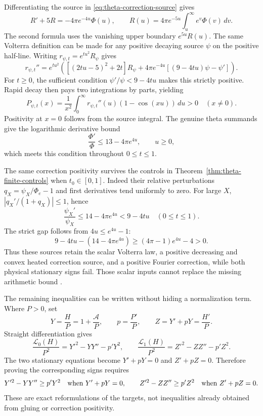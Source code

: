 \documentclass[11pt]{article}
\numberwithin{equation}{section}
\theoremstyle{definition}
\theoremstyle{remark}
\begin{document}
Differentiating the source in
\eqref{eq:theta-correction-source} gives
\begin{equation}
 R'+5R=-4\pi e^{-4u}\Phi(u),\qquad
 R(u)=4\pi e^{-5u}\int_u^\infty e^v\Phi(v)\,dv.
 \label{eq:theta-volterra-law}
\end{equation}
The second formula uses the vanishing upper boundary $e^{5u}R(u)$.
The same Volterra definition can be made for any positive decaying
source $\psi$ on the positive half-line.  Writing
$r_{\psi,t}=e^{tu^2}R_\psi$ gives
\begin{equation}
 r_{\psi,t}''=e^{tu^2}\left(
   [(2tu-5)^2+2t]R_\psi
    +4\pi e^{-4u}[(9-4tu)\psi-\psi']\right).
 \label{eq:theta-correction-curvature}
\end{equation}
For $t\ge0$, the sufficient condition
$\psi'/\psi<9-4tu$ makes this strictly positive.  Rapid decay then
pays two integrations by parts, yielding
\begin{equation}
 P_{\psi,t}(x)=\frac1{x^2}\int_0^\infty
                r_{\psi,t}''(u)(1-\cos(xu))\,du>0
 \quad(x\ne0).
 \label{eq:theta-positive-correction}
\end{equation}
Positivity at $x=0$ follows from the source integral.  The genuine
theta summands give the logarithmic derivative bound
\[
 \frac{\Phi'}{\Phi}\le13-4\pi e^{4u},\qquad u\ge0,
\]
which meets this condition throughout $0\le t\le1$.

The same correction positivity survives the controls in
Theorem~\ref{thm:theta-finite-controls} when $t_0\in[0,1]$.  Indeed
their relative perturbations $q_X=\psi_X/\Phi_e-1$ and first
derivatives tend uniformly to zero.  For large $X$,
$|q_X'/(1+q_X)|\le1$, hence
\[
 \frac{\psi_X'}{\psi_X}\le14-4\pi e^{4u}<9-4tu
 \quad(0\le t\le1).
\]
The strict gap follows from $4u\le e^{4u}-1$:
\[
 9-4tu-(14-4\pi e^{4u})
 \ge(4\pi-1)e^{4u}-4>0.
\]
Thus these sources retain the scalar Volterra law, a positive
decreasing and convex heated correction source, and a positive Fourier
correction, while both physical stationary signs fail.  Those scalar
inputs cannot replace the missing arithmetic bound
\cite{localobstruction,volterranote}.

The remaining inequalities can be written without hiding a
normalization term.  Where $P>0$, set
\[
 Y=\frac HP=1+\frac{\mathscr A}P,\qquad
 p=\frac{P'}P,\qquad Z=Y'+pY=\frac{H'}P.
\]
Straight differentiation gives
\begin{equation}
 \frac{\mathscr L_0(H)}{P^2}=Y'^2-YY''-p'Y^2,
 \qquad
 \frac{\mathscr L_1(H)}{P^2}=Z'^2-ZZ''-p'Z^2.
 \label{eq:theta-normalized-targets}
\end{equation}
The two stationary equations become $Y'+pY=0$ and $Z'+pZ=0$.
Therefore proving the corresponding signs requires
\[
 Y'^2-YY''\ge p'Y^2\quad\hbox{when }Y'+pY=0,
 \qquad
 Z'^2-ZZ''\ge p'Z^2\quad\hbox{when }Z'+pZ=0.
\]
These are exact reformulations of the targets, not inequalities
already obtained from gluing or correction positivity.
\end{document}
